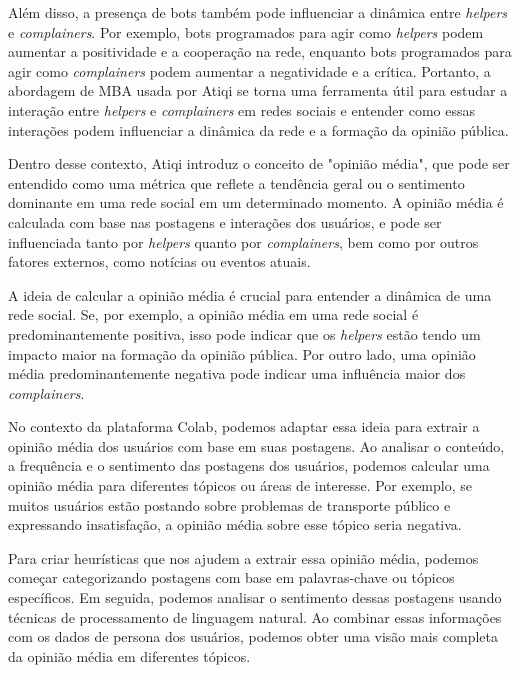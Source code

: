 Além disso, a presença de bots também pode influenciar a dinâmica entre \textit{helpers} e \textit{complainers}. Por exemplo, bots programados para agir como \textit{helpers} podem aumentar a positividade e a cooperação na rede, enquanto bots programados para agir como \textit{complainers} podem aumentar a negatividade e a crítica. Portanto, a abordagem de MBA usada por Atiqi se torna uma ferramenta útil para estudar a interação entre \textit{helpers} e \textit{complainers} em redes sociais e entender como essas interações podem influenciar a dinâmica da rede e a formação da opinião pública.

Dentro desse contexto, Atiqi introduz o conceito de "opinião média", que pode ser entendido como uma métrica que reflete a tendência geral ou o sentimento dominante em uma rede social em um determinado momento. A opinião média é calculada com base nas postagens e interações dos usuários, e pode ser influenciada tanto por \textit{helpers} quanto por \textit{complainers}, bem como por outros fatores externos, como notícias ou eventos atuais.

A ideia de calcular a opinião média é crucial para entender a dinâmica de uma rede social. Se, por exemplo, a opinião média em uma rede social é predominantemente positiva, isso pode indicar que os \textit{helpers} estão tendo um impacto maior na formação da opinião pública. Por outro lado, uma opinião média predominantemente negativa pode indicar uma influência maior dos \textit{complainers}.

No contexto da plataforma Colab, podemos adaptar essa ideia para extrair a opinião média dos usuários com base em suas postagens. Ao analisar o conteúdo, a frequência e o sentimento das postagens dos usuários, podemos calcular uma opinião média para diferentes tópicos ou áreas de interesse. Por exemplo, se muitos usuários estão postando sobre problemas de transporte público e expressando insatisfação, a opinião média sobre esse tópico seria negativa.

Para criar heurísticas que nos ajudem a extrair essa opinião média, podemos começar categorizando postagens com base em palavras-chave ou tópicos específicos. Em seguida, podemos analisar o sentimento dessas postagens usando técnicas de processamento de linguagem natural. Ao combinar essas informações com os dados de persona dos usuários, podemos obter uma visão mais completa da opinião média em diferentes tópicos.

